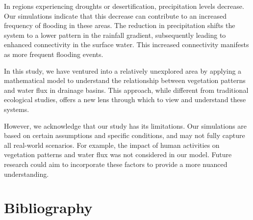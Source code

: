 \documentclass{article}
\numberwithin{equation}{section}
\begin{document}
In regions experiencing droughts or desertification, precipitation levels decrease. Our simulations indicate that this decrease can contribute to an increased frequency of flooding in these areas. The reduction in precipitation shifts the system to a lower pattern in the rainfall gradient, subsequently leading to enhanced connectivity in the surface water. This increased connectivity manifests as more frequent flooding events.

In this study, we have ventured into a relatively unexplored area by applying a mathematical model to understand the relationship between vegetation patterns and water flux in drainage basins. This approach, while different from traditional ecological studies, offers a new lens through which to view and understand these systems.

However, we acknowledge that our study has its limitations. Our simulations are based on certain assumptions and specific conditions, and may not fully capture all real-world scenarios. For example, the impact of human activities on vegetation patterns and water flux was not considered in our model. Future research could aim to incorporate these factors to provide a more nuanced understanding.

\section{Bibliography}
\printbibliography
\end{document}
